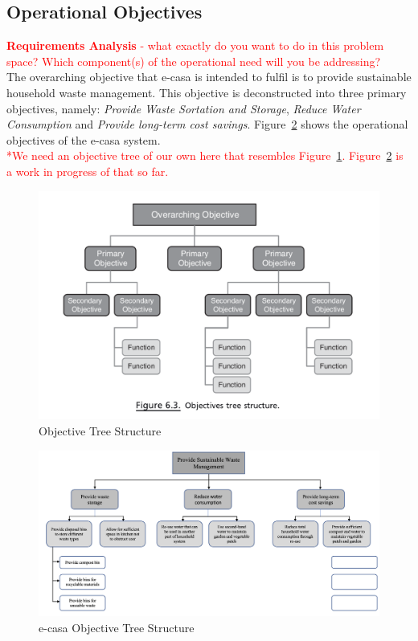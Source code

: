 \documentclass[a4paper,11pt,fleqn]{report}
\begin{document}
\subsection{Operational Objectives}
\textcolor{red}{\textbf{Requirements Analysis} - what exactly do you want to do in this problem space? Which component(s) of the operational need will you be addressing?}\\

The overarching objective that \ac{e-casa} is intended to fulfil is to provide sustainable household waste management. This objective is deconstructed into three primary objectives, namely: \textit{Provide Waste Sortation and Storage}, \textit{Reduce Water Consumption} and \textit{Provide long-term cost savings}. Figure~\ref{fig: ecasaOT} shows the operational objectives of the \ac{e-casa} system.\\

\textcolor{red}{*We need an objective tree of our own here that resembles Figure~\ref{fig: ObjectiveTreeStructure}. Figure~\ref{fig: ecasaOT} is a work in progress of that so far.}

\begin{figure}[h!]
\begin{center}
\includegraphics[scale = 0.6]{Objective_Tree_Structure.png}
\caption{Objective Tree Structure}
\label{fig: ObjectiveTreeStructure}
\end{center}
\end{figure}

\begin{figure}[h!]
\begin{center}
\includegraphics[scale = 0.34]{ecasa_OT.png}
\caption{e-casa Objective Tree Structure}
\label{fig: ecasaOT}
\end{center}
\end{figure}
\end{document}

